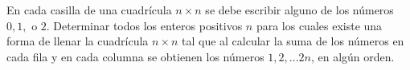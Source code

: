 En cada casilla de una cuadrícula $n \times n$ se debe escribir alguno de los números $0, 1,$ o $2$. Determinar todos los enteros positivos $n$ para los cuales existe una forma de llenar la cuadrícula $n \times n$ tal que al calcular la suma de los números en cada fila y en cada columna se obtienen los números $1, 2, \dots 2n$, en algún orden.